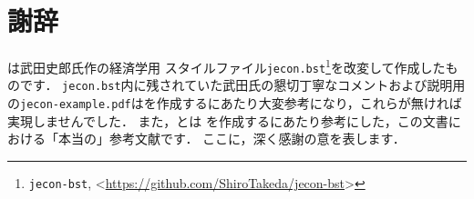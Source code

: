 \clearpage
\section*{謝辞}
\label{sec:acknowledgment}
\jsmefile は武田史郎氏作の経済学用 \BibTeX スタイルファイル\verb|jecon.bst|\footnote{\verb|jecon-bst|, \textless\url{https://github.com/ShiroTakeda/jecon-bst}\textgreater}を改変して作成したものです．
\verb|jecon.bst|内に残されていた武田氏の懇切丁寧なコメントおよび説明用の\verb|jecon-example.pdf|は\jsmefile を作成するにあたり大変参考になり，これらが無ければ実現しませんでした．
また，\citet{奥村:技評2020}と\citet{吉永:翔泳社2018}は \JSMErepos を作成するにあたり参考にした，この文書における「本当の」参考文献です．
ここに，深く感謝の意を表します．
